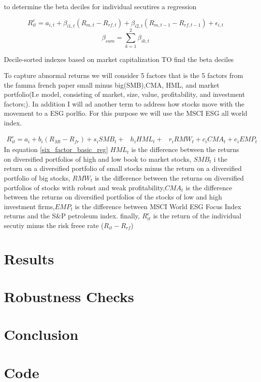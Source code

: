 \documentclass[12pt,oneside,reqno]{amsart}
\begin{document}
to determine the beta deciles for individual secutires a regression 

\begin{equation}
    R_{it}^e = a_{i,t} + \beta_{i1,t}(R_{m,t}-R_{rf,t})+\beta_{i2,t}(R_{m,t-1}-R_{rf,t-1})+\epsilon_{i,t}
\end{equation}
\begin{equation}
    \beta_{sum} = \sum_{k=1}^2\beta_{ik,t}
\end{equation}



Decile-sorted indexes based on
market capitalization
TO find the beta deciles 


To capture abnormal returns we will consider 5 factors that is the 5 factors from the famma french paper small minus big(SMB),CMA, HML, and market portfolio(I.e model, consisting of market, size, value, profitability, and investment factors;). In addition I will ad another term to address how stocks move with the movement to a ESG porlfio. For this purpose we will use the MSCI ESG all world index. 

\begin{equation}
\begin{split}
    R_{it}^e = a_i+b_i(R_{Mt}-R_{fr})+s_iSMB_t+ & h_iHML_t+ & r_iRMW_t+c_iCMA_t+e_iEMP_t
    \end{split}
    \label{six_factor_basic_reg}
\end{equation}
In equation \eqref{six_factor_basic_reg} $HML_{t}$ is the difference between the returns on diversified portfolios of high and low book to market stocks, $SMB_{t}$ i the return on a diversified portfolio of small stocks minus the return on a diversified portfolio of big stocks, $RMW_t$ is the difference between the returns on diversified portfolios of stocks with robust and weak profitability,$CMA_{t}$ is the difference between the returns on diversified portfolios of the stocks of low and high investment firms,$EMP_t$ is the difference between MSCI World ESG Focus Index returns and the S\&P petroleum index. finally, $R^e_{it}$ is the return of the individual secutiy minus the risk freee rate ($R_{it}-R_{rf}$)


\section{Results}
\label{Results}

\section{Robustness Checks}
\label{Robustness}

\section{Conclusion}
\label{Conclusion}

{}


\section{Code}

\end{document}
